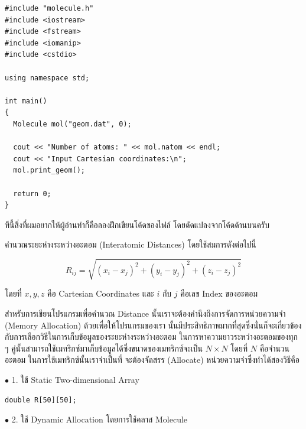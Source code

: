 \begin{lstlisting}[style=MyC++]
#include "molecule.h"
#include <iostream>
#include <fstream>
#include <iomanip>
#include <cstdio>

using namespace std;

int main()
{
  Molecule mol("geom.dat", 0);

  cout << "Number of atoms: " << mol.natom << endl;
  cout << "Input Cartesian coordinates:\n";
  mol.print_geom();

  return 0;
}
\end{lstlisting}

\vspace{5pt}

\noindent ทีนี้สิ่งที่ผมอยากให้ผู้อ่านทำก็คือลองฝึกเขียนโค้ดของไฟล์  โดยดัดแปลงจากโค้ดด้านบนครับ

\noindent {}

คำนวณระยะห่างระหว่างอะตอม (Interatomic Distances) โดยใช้สมการดังต่อไปนี้

\begin{equation}
  R_{ij}
  =
  \sqrt{
    (x_{i} - x_{j})^{2}
    + (y_{i} - y_{j})^{2}
    + (z_{i} - z_{j})^{2}
  }
\end{equation}

\noindent โดยที่ $x, y, z$ คือ Cartesian Coordinates และ $i$ กับ $j$ คือเลข Index ของอะตอม

สำหรับการเขียนโปรแกรมเพื่อคำนวณ Distance นั้นเราจะต้องคำนึงถึงการจัดการหน่วยความจำ (Memory Allocation) ด้วยเพื่อให้โปรแกรมของเรา%
นั้นมีประสิทธิภาพมากที่สุดซึ่งนั่นก็จะเกี่ยวข้องกับการเลือกวิธีในการเก็บข้อมูลของระยะห่างระหว่างอะตอม ในการหาความยาวระหว่างอะตอมของทุก ๆ
คู่นั้นสามารถใช้เมทริกซ์มาเก็บข้อมูลได้ซึ่งขนาดของเมทริกซ์จะเป็น $N \times N$ โดยที่ $N$ คือจำนวนอะตอม ในการใช้เมทริกซ์นั้นเราจำเป็นที่%
จะต้องจัดสรร (Allocate) หน่วยความจำซึ่งทำได้สองวิธีคือ

\noindent $\bullet$ 1. ใช้ Static Two-dimensional Array

\vspace{5pt}

\begin{lstlisting}[style=MyC++]
double R[50][50];
\end{lstlisting}

\vspace{5pt}

\noindent $\bullet$ 2. ใช้ Dynamic Allocation โดยการใช้คลาส Molecule

\vspace{5pt}

